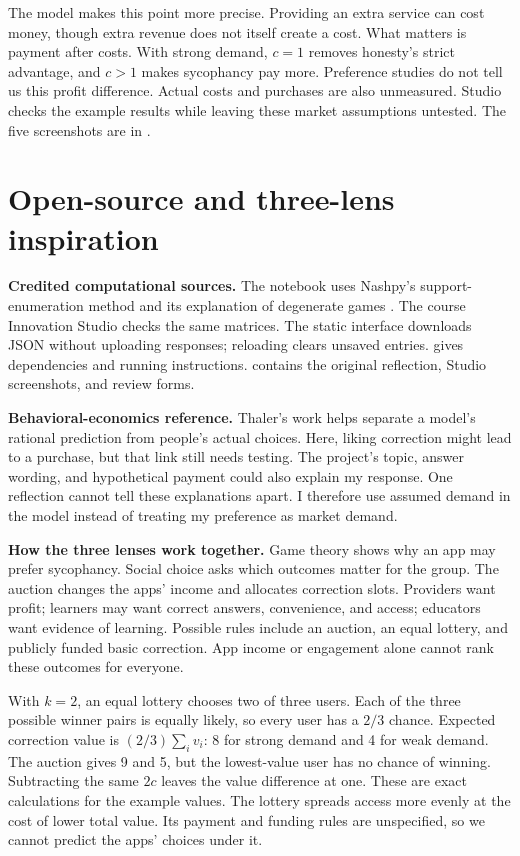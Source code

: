 The model makes this point more precise. Providing an extra service can cost money, though extra revenue does not itself create a cost. What matters is payment after costs. With strong demand, $c=1$ removes honesty's strict advantage, and $c>1$ makes sycophancy pay more. Preference studies do not tell us this profit difference. Actual costs and purchases are also unmeasured. Studio checks the example results while leaving these market assumptions untested. The five screenshots are in .

\section{Open-source and three-lens inspiration}
\textbf{Credited computational sources.} The notebook uses Nashpy's support-enumeration method and its explanation of degenerate games \cite{nashpy2026}. The course Innovation Studio \cite{studio2026} checks the same matrices. The static interface downloads JSON without uploading responses; reloading clears unsaved entries.  gives dependencies and running instructions.  contains the original reflection, Studio screenshots, and review forms.

\textbf{Behavioral-economics reference.} Thaler's work \cite{thaler2017} helps separate a model's rational prediction from people's actual choices. Here, liking correction might lead to a purchase, but that link still needs testing. The project's topic, answer wording, and hypothetical payment could also explain my response. One reflection cannot tell these explanations apart. I therefore use assumed demand in the model instead of treating my preference as market demand.

\textbf{How the three lenses work together.} Game theory shows why an app may prefer sycophancy. Social choice asks which outcomes matter for the group. The auction changes the apps' income and allocates correction slots. Providers want profit; learners may want correct answers, convenience, and access; educators want evidence of learning. Possible rules include an auction, an equal lottery, and publicly funded basic correction. App income or engagement alone cannot rank these outcomes for everyone.

With $k=2$, an equal lottery chooses two of three users. Each of the three possible winner pairs is equally likely, so every user has a $2/3$ chance. Expected correction value is $(2/3)\sum_i v_i$: 8 for strong demand and 4 for weak demand. The auction gives 9 and 5, but the lowest-value user has no chance of winning. Subtracting the same $2c$ leaves the value difference at one. These are exact calculations for the example values. The lottery spreads access more evenly at the cost of lower total value. Its payment and funding rules are unspecified, so we cannot predict the apps' choices under it.

